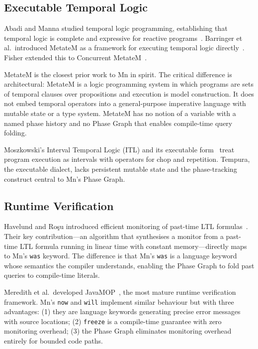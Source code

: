 \documentclass[11pt,a4paper]{article}
\begin{document}
\subsection{Executable Temporal Logic}

Abadi and Manna studied temporal logic programming, establishing that temporal logic is complete
and expressive for reactive programs~\cite{abadi1989}. Barringer et al.\ introduced MetateM as a
framework for executing temporal logic directly~\cite{barringer1990,barringer1995}. Fisher extended
this to Concurrent MetateM~\cite{fisher1993}.

MetateM is the closest prior work to Mn in spirit. The critical difference is architectural:
MetateM is a logic programming system in which programs are sets of temporal clauses over
propositions and execution is model construction. It does not embed temporal operators into a
general-purpose imperative language with mutable state or a type system. MetateM has no notion
of a variable with a named phase history and no Phase Graph that enables compile-time query
folding.

Moszkowski's Interval Temporal Logic (ITL) and its executable form~\cite{moszkowski1986} treat
program execution as intervals with operators for chop and repetition. Tempura, the executable
dialect, lacks persistent mutable state and the phase-tracking construct central to Mn's Phase
Graph.

\subsection{Runtime Verification}

Havelund and Ro\c{s}u introduced efficient monitoring of past-time LTL formulas~\cite{havelund2002}.
Their key contribution---an algorithm that synthesises a monitor from a past-time LTL formula
running in linear time with constant memory---directly maps to Mn's \texttt{was} keyword. The
difference is that Mn's \texttt{was} is a language keyword whose semantics the compiler
understands, enabling the Phase Graph to fold past queries to compile-time literals.

Meredith et al.\ developed JavaMOP~\cite{meredith2012}, the most mature runtime verification
framework. Mn's \texttt{now} and \texttt{will} implement similar behaviour but with three
advantages: (1) they are language keywords generating precise error messages with source
locations; (2) \texttt{freeze} is a compile-time guarantee with zero monitoring overhead;
(3) the Phase Graph eliminates monitoring overhead entirely for bounded code paths.
\end{document}
